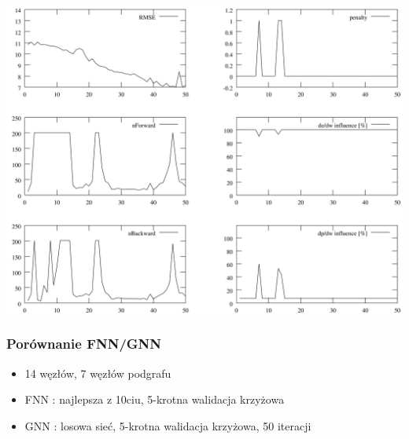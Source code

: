 \documentclass{beamer}
\begin{document}
\begin{frame}
	\includegraphics[scale=0.065]{img/params_set3}
\end{frame}

\begin{frame}
\frametitle{Porównanie FNN/GNN}
\begin{itemize}
	\item 14 węzłów, 7 węzłów podgrafu
	\item FNN : najlepsza z 10ciu, 5-krotna walidacja krzyżowa
	\item GNN : losowa sieć, 5-krotna walidacja krzyżowa, 50 iteracji
\end{itemize}
\end{frame}
\end{document}
